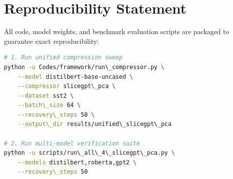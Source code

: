 \section{Reproducibility Statement}
All code, model weights, and benchmark evaluation scripts are packaged to guarantee exact reproducibility:
\begin{lstlisting}[language=bash]
# 1. Run unified compression sweep
python -u Codes/framework/run\_compressor.py \
    --model distilbert-base-uncased \
    --compressor slicegpt\_pca \
    --dataset sst2 \
    --batch\_size 64 \
    --recovery\_steps 50 \
    --output\_dir results/unified\_slicegpt\_pca

# 2. Run multi-model verification suite
python -u scripts/run\_all\_4\_slicegpt\_pca.py \
    --models distilbert,roberta,gpt2 \
    --recovery\_steps 50
\end{lstlisting}
